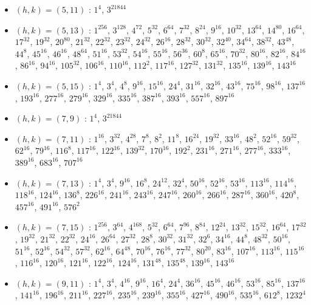 \begin{itemize}
\item $(h,k)=(5,11)$ : $1^{4}$, $3^{21844}$
\item $(h,k)=(5,13)$ : $1^{256}$, $3^{128}$, $4^{72}$, $5^{32}$, $6^{64}$, $7^{32}$, $8^{24}$, $9^{16}$, $10^{32}$, $13^{64}$, $14^{80}$, $16^{64}$, $17^{32}$, $19^{32}$, $20^{80}$, $21^{32}$, $22^{32}$, $23^{32}$, $24^{32}$, $26^{16}$, $28^{32}$, $30^{32}$, $32^{40}$, $34^{64}$, $38^{32}$, $43^{48}$, $44^{8}$, $45^{16}$, $46^{16}$, $48^{64}$, $51^{16}$, $53^{32}$, $54^{16}$, $55^{16}$, $56^{36}$, $60^{8}$, $65^{16}$, $70^{32}$, $80^{16}$, $82^{16}$, $84^{16}$, $86^{16}$, $94^{16}$, $105^{32}$, $106^{16}$, $110^{16}$, $112^{2}$, $117^{16}$, $127^{32}$, $131^{32}$, $135^{16}$, $139^{16}$, $143^{16}$
\item $(h,k)=(5,15)$ : $1^{4}$, $3^{4}$, $4^{8}$, $9^{16}$, $15^{16}$, $24^{4}$, $31^{16}$, $32^{16}$, $43^{16}$, $75^{16}$, $98^{16}$, $137^{16}$, $193^{16}$, $277^{16}$, $279^{16}$, $329^{16}$, $335^{16}$, $387^{16}$, $393^{16}$, $557^{16}$, $897^{16}$
\item $(h,k)=(7,9)$ : $1^{4}$, $3^{21844}$
\item $(h,k)=(7,11)$ : $1^{16}$, $3^{32}$, $4^{28}$, $7^{8}$, $8^{2}$, $11^{8}$, $16^{24}$, $19^{32}$, $33^{16}$, $48^{2}$, $52^{16}$, $59^{32}$, $62^{16}$, $79^{16}$, $116^{8}$, $117^{16}$, $122^{16}$, $139^{32}$, $170^{16}$, $192^{2}$, $231^{16}$, $271^{16}$, $277^{16}$, $333^{16}$, $389^{16}$, $683^{16}$, $707^{16}$
\item $(h,k)=(7,13)$ : $1^{4}$, $3^{4}$, $9^{16}$, $16^{8}$, $24^{12}$, $32^{4}$, $50^{16}$, $52^{16}$, $53^{16}$, $113^{16}$, $114^{16}$, $118^{16}$, $124^{16}$, $136^{8}$, $226^{16}$, $241^{16}$, $243^{16}$, $247^{16}$, $260^{16}$, $266^{16}$, $287^{16}$, $360^{16}$, $420^{8}$, $457^{16}$, $491^{16}$, $576^{2}$
\item $(h,k)=(7,15)$ : $1^{256}$, $3^{64}$, $4^{168}$, $5^{32}$, $6^{64}$, $7^{96}$, $8^{84}$, $12^{24}$, $13^{32}$, $15^{32}$, $16^{64}$, $17^{32}$, $19^{32}$, $21^{32}$, $22^{32}$, $24^{16}$, $26^{64}$, $27^{32}$, $28^{8}$, $30^{32}$, $31^{32}$, $32^{6}$, $34^{16}$, $44^{8}$, $48^{32}$, $50^{16}$, $51^{16}$, $52^{16}$, $54^{32}$, $57^{32}$, $62^{16}$, $64^{48}$, $70^{16}$, $76^{16}$, $77^{32}$, $80^{20}$, $83^{16}$, $107^{16}$, $113^{16}$, $115^{16}$, $116^{16}$, $120^{16}$, $121^{16}$, $122^{16}$, $124^{16}$, $131^{48}$, $135^{48}$, $139^{16}$, $143^{16}$
\item $(h,k)=(9,11)$ : $1^{4}$, $3^{4}$, $4^{16}$, $9^{16}$, $16^{4}$, $24^{4}$, $36^{16}$, $45^{16}$, $46^{16}$, $53^{16}$, $85^{16}$, $137^{16}$, $141^{16}$, $196^{16}$, $211^{16}$, $227^{16}$, $235^{16}$, $239^{16}$, $355^{16}$, $427^{16}$, $490^{16}$, $535^{16}$, $612^{8}$, $1232^{4}$

\end{itemize}
